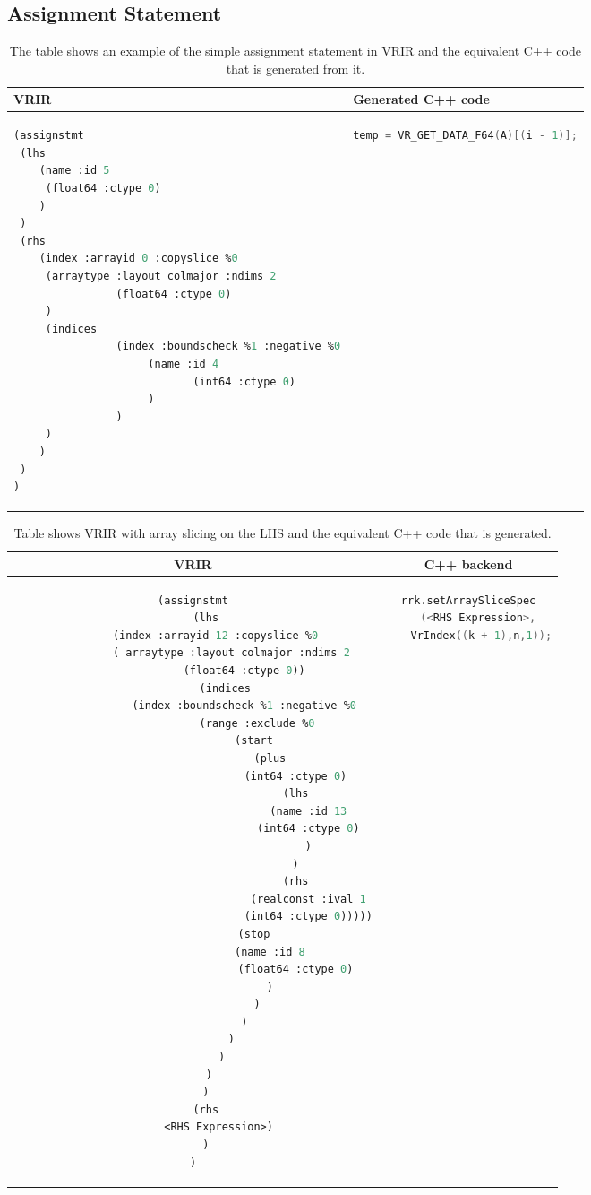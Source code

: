 \subsection{Assignment Statement}
	\begin{table}[htbp]
	\begin{tabular}{|l|l|}
					\hline
							VRIR & Generated C++ code\\
							\hline
{
\begin{lstlisting}[frame=none, language=lisp, label={lst:SimpleAssignment},numbers=none]
(assignstmt
 (lhs
	(name :id 5
	 (float64 :ctype 0)
	)
 )
 (rhs
	(index :arrayid 0 :copyslice %0
	 (arraytype :layout colmajor :ndims 2
				(float64 :ctype 0)
	 )
	 (indices
				(index :boundscheck %1 :negative %0
					 (name :id 4
							(int64 :ctype 0)
					 )
				)
	 )
	)
 )
)
\end{lstlisting}
} & 
{
\begin{lstlisting}[frame=none, language=c, label={lst:SimpleAssignment},numbers=none]
temp = VR_GET_DATA_F64(A)[(i - 1)];
\end{lstlisting}
} \\
\hline
\end{tabular}
\caption[Simple Assignment Statement]{ The table shows an example of the simple assignment statement in VRIR and the equivalent C++ code that is generated from it.}
\label{tab:simpleAssignment}
\end{table}

\begin{table}[htbp]
\begin{tabular}{|c|c|}
\hline
VRIR & C++ backend \\
\hline
{
\begin{lstlisting}[language=lisp, frame=none, numbers=none]
(assignstmt
	(lhs
		(index :arrayid 12 :copyslice %0 
			( arraytype :layout colmajor :ndims 2
			 	(float64 :ctype 0))
		  (indices
				(index :boundscheck %1 :negative %0
			 		(range :exclude %0
			  		(start 
			   			(plus
								(int64 :ctype 0)
								(lhs
				 					(name :id 13
				  					(int64 :ctype 0)
									)
								)
								(rhs
				 					(realconst :ival 1
				  					(int64 :ctype 0)))))
			  		(stop 
			   			(name :id 8
								(float64 :ctype 0)
			   			)
			  		)
			 	)
			)
		 )
	 )
	)
	(rhs
		<RHS Expression>)
	)
)
\end{lstlisting}
} & 
{
\begin{lstlisting}[language=c,frame=none, numbers=none]
rrk.setArraySliceSpec
	(<RHS Expression>, 
	VrIndex((k + 1),n,1));
		\end{lstlisting}
} \\
\hline
\end{tabular}
\caption[Assignment with array slice set]{Table shows VRIR with array slicing on the LHS and the equivalent C++ code that is generated.}
\label{tab:sliceAssign}
\end{table}

